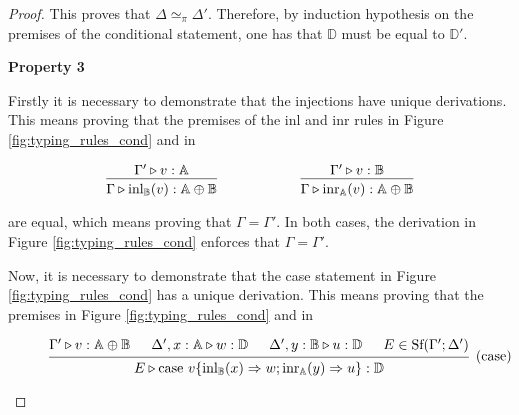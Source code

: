 \documentclass[10pt,a4paper]{amsart}
\theoremstyle{definition}
\theoremstyle{definition}
\theoremstyle{definition}
\theoremstyle{definition}
\theoremstyle{definition}
\theoremstyle{definition}
\begin{document}
\begin{proof}
This proves that $\Delta \simeq_{\pi} \Delta'$. Therefore, by induction hypothesis on the premises of the conditional statement, one has that $\mathbb{D}$ must be equal to $\mathbb{D}'$.
  

\vspace{10pt}
    \textbf{Property 3}

    Firstly it is necessary to demonstrate that the injections have unique derivations. This means proving that the premises of the inl and inr rules in Figure \ref{fig:typing_rules_cond} and in
\begin{figure} [H]
  \begin{equation*}
  \begin{aligned}
    &
    \begin{prooftree}
    \hypo{\Gamma' \triangleright v: \mathbb{A}}
    \infer1[]{\Gamma \triangleright \text{inl}_{\mathbb{B}}(v): \mathbb{A} \oplus \mathbb{B}}
    \end{prooftree}
    \hspace{60pt}
    \begin{prooftree}
    \hypo{\Gamma' \triangleright v: \mathbb{B}}
    \infer1[]{\Gamma \triangleright \text{inr}_{\mathbb{A}}(v): \mathbb{A} \oplus \mathbb{B}}
    \end{prooftree} \\
  \end{aligned}
  \end{equation*}
  \end{figure}

are equal, which means proving that $\Gamma = \Gamma'$. In both cases, the derivation in Figure \ref{fig:typing_rules_cond} enforces that $\Gamma = \Gamma'$.

Now, it is necessary to demonstrate that the case statement in Figure \ref{fig:typing_rules_cond} has a unique derivation. This means proving that the premises in Figure \ref{fig:typing_rules_cond} and in

\begin{figure} [H]
  \begin{equation*}
  \begin{aligned}
    \begin{prooftree}
        \hypo{\Gamma' \triangleright v: \mathbb{A} \oplus \mathbb{B}}
        \hypo{\Delta', x: \mathbb{A} \triangleright w: \mathbb{D}}
        \hypo{\Delta', y: \mathbb{B} \triangleright u: \mathbb{D}}
        \hypo{E \in \text{Sf}(\Gamma'; \Delta')}
        \infer4[(case)]{E \triangleright \text{case } v \{\text{inl}_{\mathbb{B}}(x) \Rightarrow w ; \text{inr}_{\mathbb{A}}(y) \Rightarrow u\}: \mathbb{D}}
        \end{prooftree}
  \end{aligned}
  \end{equation*}
  \end{figure}


\end{proof}
\end{document}
